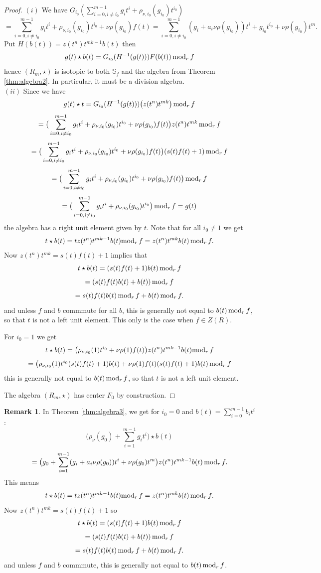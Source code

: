 \documentclass[12pt]{amsart}
\theoremstyle{plain}
\theoremstyle{definition}
\newtheorem{remark}[theorem]{Remark}
\numberwithin{equation}{section}
\numberwithin{figure}{section}
\begin{document}
\begin{proof}
$(i)$ We have
$G_{i_0}(\sum_{i=0,i\not=i_0}^{m-1} g_it^i +\rho_{\nu,i_0}(g_{i_0})t^{i_0})$
$$=\sum_{i=0,i\not=i_0}^{m-1} g_it^i +\rho_{\nu,i_0}(g_{i_0})t^{i_0}+\nu\rho(g_{i_0})f(t)=
\sum_{i=0,i\not=i_0}^{m-1} (g_i +a_i \nu \rho(g_{i_0})  )t^i +   g_{i_0}t^{i_0}+ \nu\rho(g_{i_0})t^m.$$
 Put $H(b(t))= z(t^n)t^{mk-1}b(t)$ then
 $$g(t) \star b(t)=G_{i_0}(H^{-1}(g(t))) F(b(t)) \, {\rm mod}_r\, f$$
 hence $(R_m,\star)$ is isotopic to both $\mathbb{S}_f$ and the algebra from  Theorem  \ref{thm:algebra2}. In particular, it must be a division algebra.
 \\ $(ii)$ Since  we have
 $$g(t) \star t=G_{i_0}(H^{-1}(g(t))) \big( z(t^n)t^{mk}\big) \, {\rm mod}_r\, f$$
$$=\big(\sum_{i=0,i\not=i_0}^{m-1} g_it^i +\rho_{\nu,i_0}(g_{i_0})t^{i_0} + \nu\rho(g_{i_0})f(t)\big) z(t^n)t^{mk} \, {\rm mod}_r\,f$$
$$=\big(\sum_{i=0,i\not=i_0}^{m-1} g_it^i +\rho_{\nu,i_0}(g_{i_0})t^{i_0} + \nu\rho(g_{i_0})f(t)\big)  (s(t)f(t)+1) \, {\rm mod}_r\,f$$
$$=\big(\sum_{i=0,i\not=i_0}^{m-1} g_it^i +\rho_{\nu,i_0}(g_{i_0})t^{i_0} + \nu\rho(g_{i_0})f(t)\big)   \, {\rm mod}_r\,f$$
$$=\big(\sum_{i=0,i\not=i_0}^{m-1} g_it^i +\rho_{\nu,i_0}(g_{i_0})t^{i_0}\big)   \, {\rm mod}_r\,f=g(t)$$
the algebra has a right unit element given by $t$.
Note that for all $i_0\not=1$ we  get
$$ t \star b(t)
=t   z(t^n)t^{mk-1} b(t) {\rm mod}_r\,f=  z(t^n)t^{mk} b(t)\, {\rm mod}_r\,f.$$
Now $ z(t^n)t^{mk}=s(t)f(t)+1$ implies that
$$ t \star b(t)=  (s(t)f(t)+1) b(t) \, {\rm mod}_r\,f$$
$$= (s(t)f(t) b(t) +b(t))\, {\rm mod}_r\,f$$
$$= s(t)f(t) b(t)\, {\rm mod}_r\,f +   b(t)\, {\rm mod}_r\,f.$$
and unless $f$ and $b$ commmute for all $b$, this is generally not equal to $ b(t) \,{\rm mod}_r\,f$, so that $t$ is not a left unit element.
This only is the case when $f\in Z(R)$.

For $i_0=1$ we  get
$$ t \star b(t)
=\big(\rho_{\nu,i_0}(1)t^{i_0} + \nu\rho(1)f(t)\big)  z(t^n)t^{mk-1} b(t) {\rm mod}_r\,f$$
$$= \big(\rho_{\nu,i_0}(1)t^{i_0} (s(t)f(t)+1)  b(t)
+ \nu\rho(1)f(t)  (s(t)f(t)+1)  b(t) \, {\rm mod}_r\,f$$
this is generally not equal to $ b(t) \,{\rm mod}_r\,f$, so that $t$ is not a left unit element.

The algebra $(R_m,\star)$ has center $F_0$ by construction.
\end{proof}

\begin{remark}
In Theorem \ref{thm:algebra3}, we get for $i_0=0$ and $b(t)=\sum_{i=0}^{m-1} b_it^i $:
$$\big(\rho_{\nu}(g_{0})+\sum_{i=1}^{m-1} g_it^i  \big)\star b(t)$$
$$=\big(  g_{0}+
\sum_{i=1}^{m-1} (g_i +a_i \nu \rho(g_{0})  )t^i +   \nu\rho(g_{0})t^m \big) z(t^n)t^{mk-1} b(t) \,{\rm mod}_r\,f.$$
This means
$$ t \star b(t)
=t   z(t^n)t^{mk-1} b(t) {\rm mod}_r\,f=  z(t^n)t^{mk} b(t)\, {\rm mod}_r\,f.$$
Now $ z(t^n)t^{mk}=s(t)f(t)+1$ so
$$ t \star b(t)=  (s(t)f(t)+1) b(t) \, {\rm mod}_r\,f$$
$$= (s(t)f(t) b(t) +b(t))\, {\rm mod}_r\,f$$
$$= s(t)f(t) b(t)\, {\rm mod}_r\,f +   b(t)\, {\rm mod}_r\,f.$$
and unless $f$ and $b$ commmute, this is generally not equal to $ b(t) \,{\rm mod}_r\,f$.
\end{remark}
\end{document}

